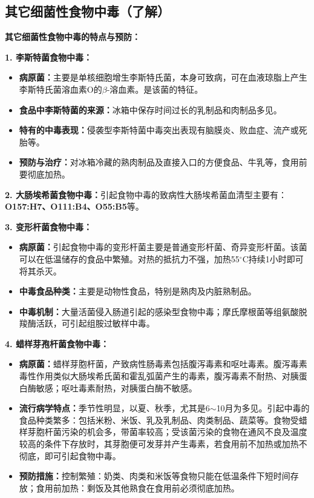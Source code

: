 \subsection{其它细菌性食物中毒（了解）}

\begin{defbox}
\textbf{其它细菌性食物中毒的特点与预防：}

\textbf{1. 李斯特菌食物中毒：}
\begin{itemize}[leftmargin=*]
    \item \textbf{病原菌：}主要是单核细胞增生李斯特氏菌，本身可致病，可在血液琼脂上产生李斯特氏菌溶血素O的$\beta$-溶血素。是该菌的特征。
    \item \textbf{食品中李斯特菌的来源：}冰箱中保存时间过长的乳制品和肉制品多见。
    \item \textbf{特有的中毒表现：}侵袭型李斯特菌中毒突出表现有脑膜炎、败血症、流产或死胎等。
    \item \textbf{预防与治疗：}对冰箱冷藏的熟肉制品及直接入口的方便食品、牛乳等，食用前要彻底加热。
\end{itemize}

\textbf{2. 大肠埃希菌食物中毒：}引起食物中毒的致病性大肠埃希菌血清型主要有：\textbf{O157:H7、O111:B4、O55:B5}等。

\textbf{3. 变形杆菌食物中毒：}
\begin{itemize}[leftmargin=*]
    \item \textbf{病原菌：}引起食物中毒的变形杆菌主要是普通变形杆菌、奇异变形杆菌。该菌可以在低温储存的食品中繁殖。对热的抵抗力不强，加热55$^\circ$C持续1小时即可将其杀灭。
    \item \textbf{中毒食品种类：}主要是动物性食品，特别是熟肉及内脏熟制品。
    \item \textbf{中毒机制：}大量活菌侵入肠道引起的感染型食物中毒；摩氏摩根菌等组氨酸脱羧酶活跃，可引起组胺过敏样中毒。
\end{itemize}

\textbf{4. 蜡样芽孢杆菌食物中毒：}
\begin{itemize}[leftmargin=*]
    \item \textbf{病原菌：}蜡样芽胞杆菌，产致病性肠毒素包括腹泻毒素和呕吐毒素。腹泻毒素毒性作用类似大肠埃希氏菌和霍乱弧菌产生的毒素，腹泻毒素不耐热、对胰蛋白酶敏感；呕吐毒素耐热，对胰蛋白酶不敏感。
    \item \textbf{流行病学特点：}季节性明显，以夏、秋季，尤其是6$\sim$10月为多见。引起中毒的食品种类繁多：包括米粉、米饭、乳及乳制品、肉类制品、蔬菜等。食物受蜡样芽胞杆菌污染的机会多，带菌率较高；受该菌污染的食物在通风不良及温度较高的条件下存放时，其芽胞便可发芽并产生毒素，若食用前不加热或加热不彻底，即可引起食物中毒。
    \item \textbf{预防措施：}控制繁殖：奶类、肉类和米饭等食物只能在低温条件下短时间存放；食用前加热：剩饭及其他熟食在食用前必须彻底加热。
\end{itemize}


\end{defbox}
